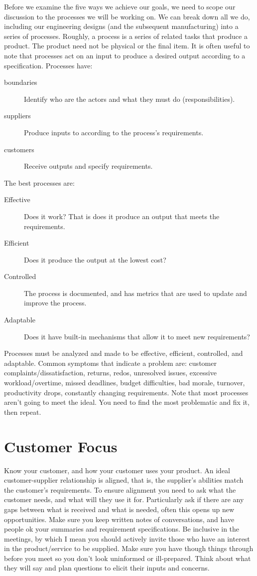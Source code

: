 Before we examine the five ways we achieve our goals, we need to scope our discussion to the processes we will be working on.  We can break down all we do, including our engineering designs (and the subsequent manufacturing) into a series of processes.  Roughly, a process is a series of related tasks that produce a product.  The product need not be physical or the final item.  It is often useful to note that processes act on an input to produce a desired output according to a specification.  Processes have:
\begin{description}
\item[boundaries] Identify who are the actors and what they must do (responsibilities).
\item[suppliers] Produce inputs to according to the process's requirements.
\item[customers] Receive outputs and specify requirements.
\end{description}
The best processes are:
\begin{description}
  \item[Effective] Does it work?  That is does it produce an output that meets the requirements.
  \item[Efficient] Does it produce the output at the lowest cost?
  \item[Controlled] The process is documented, and has metrics that are used to update and improve the process.
  \item[Adaptable] Does it have built-in mechanisms that allow it to meet new requirements?
\end{description}
Processes must be analyzed and made to be effective, efficient, controlled, and adaptable.  Common symptoms that indicate a problem are: customer complaints/dissatisfaction, returns, redos, unresolved issues, excessive workload/overtime, missed deadlines, budget difficulties, bad morale, turnover, productivity drops, constantly changing requirements.  Note that most processes aren't going to meet the ideal.  You need to find the most problematic and fix it, then repeat.


\section{Customer Focus}
Know your customer, and how your customer uses your product.  An ideal customer-supplier relationship is aligned, that is, the supplier's abilities match the customer's requirements.  To ensure alignment you need to ask what the customer needs, and what will they use it for.  Particularly ask if there are any gaps between what is received and what is needed, often this opens up new opportunities.  Make sure you keep written notes of conversations, and have people ok your summaries and requirement specifications.  Be inclusive in the meetings, by which I mean you should actively invite those who have an interest in the product/service to be supplied.  Make sure you have though things through before you meet so you don't look uninformed or ill-prepared.  Think about what they will say and plan questions to elicit their inputs and concerns.

